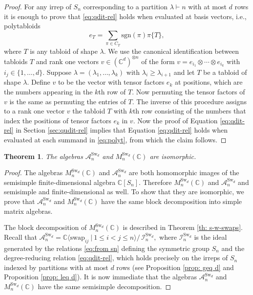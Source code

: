 \documentclass[12pt,dvipsnames,accepted=2016-08-18,a4paper,onecolumn]{quantumarticle}
\numberwithin{equation}{section}
\newcommand{\CC}{\mathbb C}
\newtheorem{theorem}{Theorem}[section]
\theoremstyle{definition}
\begin{document}
 \begin{proof} For any irrep of $S_n$ corresponding to a partition $\lambda \vdash n$ with at most $d$ rows 
      it is enough to prove that \eqref{eq:qdit-rel} holds when evaluated at basis vectors, i.e., polytabloids
     \begin{equation}\label{eq:polyt}
         e_T = \sum_{\pi \in C_T} \text{sgn}(\pi) \pi\{T\},
     \end{equation}
 where $T$ is any tabloid of shape $\lambda.$  We use the canonical identification between tabloids $T$ and rank one vectors $v \in (\CC^d)^{\otimes n}$ of the form $v= e_{i_1}\otimes \cdots \otimes e_{i_k}$ with $i_j \in \{1,\ldots, d\}.$  Suppose $\lambda = (\lambda_1,\ldots,\lambda_k)$ with $\lambda_i \geq \lambda_{i+1}$ and let $T$ be a tabloid of shape $\lambda.$ Define $v$ to be the vector 
 with tensor factors $e_k$ at positions, which are the numbers appearing in the $k$th row of $T.$ Now permuting the tensor factors of $v$ is the same as permuting the entries of $T.$ The inverse of this procedure assigns to a rank one vector $v$ the tabloid $T$ with $k$th row consisting of the numbers that index the positions of tensor factors $e_k$ in $v.$
 Now the  proof of Equation \eqref{eq:qdit-rel} in Section \ref{sec:qudit-rel} implies that Equation \eqref{eq:qdit-rel} holds when evaluated at each summand in \eqref{eq:polyt}, from which the claim follows. 
 \end{proof}
	
			 

\begin{theorem}\label{th:iso}
    The algebras $\mathcal{A}^{\text{Sw}_d}_n$ and $M^{\text{Sw}_d}_n(\mathbb{C})$ are isomorphic.
\end{theorem}

\begin{proof} The algebras $M^{\text{Sw}_d}_n(\mathbb{C})$ and $\mathcal{A}^{\text{Sw}_d}_n$ are both homomorphic images of the semisimple finite-dimensional algebra $\CC[S_n]$. Therefore $M^{\text{Sw}_d}_n(\mathbb{C})$ and $\mathcal{A}^{\text{Sw}_d}_n$ and semisimple and finite-dimensional as well.
To show that they are isomorphic, we prove that $\mathcal{A}^{\text{Sw}_d}_n$ and $M^{\text{Sw}_d}_n(\mathbb{C})$ have the same block decomposition into simple matrix algebras.

The block decomposition of $M^{\text{Sw}_d}_n(\mathbb{C})$ is described in Theorem \ref{th: s-w-swaps}. Recall that $
	\mathcal{A}^{\text{Sw}_d}_n = \CC\langle \text{swap}_{ij} \ | \ 1 \leq i < j \leq n\rangle /\, \mathcal{I}^{\text{Sw}_d}_n,
	$
 where  $\mathcal{I}^{\text{Sw}_d}_n$ is the ideal generated by the relations \eqref{eq:from sn} defining the symmetric group $S_n$ and the degree-reducing relation \eqref{eq:qdit-rel}, which holds precisely on the irreps of $S_n$ indexed by partitions with at most $d$ rows (see Proposition \ref{prop: geq d} and Proposition \ref{prop: leq d}). It is now immediate that the algebras $\mathcal{A}^{\text{Sw}_d}_n$ and $M^{\text{Sw}_d}_n(\mathbb{C})$ have the same semisimple decomposition.
\end{proof}
\end{document}
